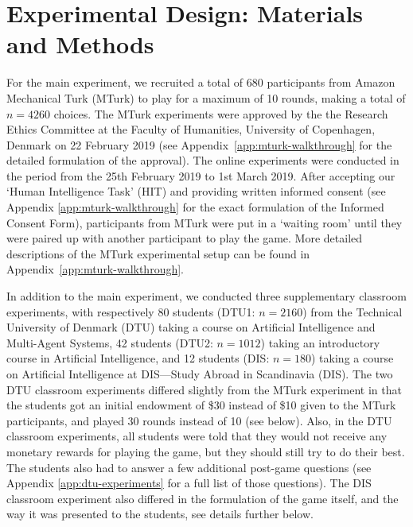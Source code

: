 \section{Experimental Design: Materials and Methods}\label{sect:experimental-design} 
For the main experiment, we recruited a total of 680 participants from Amazon Mechanical Turk (MTurk) to play for a maximum of 10 rounds, making a total of $n=4260$ choices. The MTurk experiments were approved by the the Research Ethics Committee at the Faculty of Humanities, University of Copenhagen, Denmark on 22 February 2019 (see Appendix~\ref{app:mturk-walkthrough} for the detailed formulation of the approval). The online experiments were conducted in the period from the 25th February 2019 to 1st March 2019. After accepting
our `Human Intelligence Task' (HIT) and providing written informed consent (see Appendix \ref{app:mturk-walkthrough} for the exact formulation of the Informed Consent Form), participants from MTurk were put in a `waiting room' until they were paired up with another participant to play the game. More detailed descriptions of the MTurk experimental setup can be found in Appendix~\ref{app:mturk-walkthrough}.    

In addition to the main experiment, we conducted three supplementary classroom experiments, with  respectively 80 students (DTU1: $n=2160$) from the Technical University of Denmark (DTU) taking a course on Artificial Intelligence and Multi-Agent Systems, 42 students (DTU2: $n=1012$) taking an introductory course in Artificial Intelligence, and 12 students (DIS: $n=180$) taking a course on Artificial Intelligence at DIS---Study Abroad in Scandinavia (DIS). The two DTU classroom experiments differed slightly from the MTurk experiment in that the students got an initial endowment of \$30 instead of \$10 given to the MTurk participants, and played 30 rounds instead of 10 (see below). Also, in the DTU classroom experiments, all students were told that they would not receive any monetary rewards for playing the game, but they should still try to do their best. The students also had to answer a few additional post-game questions (see  Appendix \ref{app:dtu-experiments} for a full list of those questions). The DIS classroom experiment also differed in the formulation of the game itself, and the way it was presented to the students, see details further below. 


